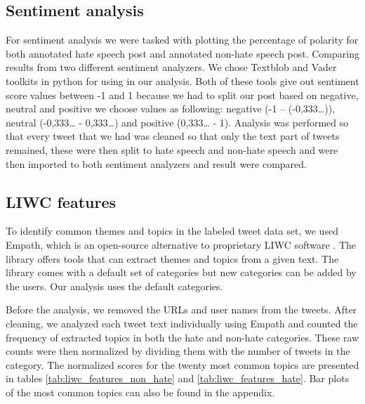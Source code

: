 \documentclass[conference]{IEEEtran}
\begin{document}
\subsection{Sentiment analysis}
For sentiment analysis we were tasked with plotting the percentage of polarity for both annotated hate speech post and annotated non-hate speech post.
Comparing results from two different sentiment analyzers. We chose Textblob and Vader toolkits in python for using in our analysis. Both of these tools give out sentiment score values between -1 and 1
because we had to split our post based on negative, neutral and positive we choose values as following: negative (-1 – (-0,333…)), neutral (-0,333… - 0,333…) and positive (0,333… - 1).
Analysis was performed so that every tweet that we had was cleaned so that only the text part of tweets remained, these were then split to hate speech and non-hate speech and were then imported to both sentiment analyzers and result were compared.
\subsection{LIWC features}
To identify common themes and topics in the labeled tweet data set, we 
used Empath, which is an open-source alternative to proprietary LIWC software  \cite{fast2016empath}. 
The library offers tools that can extract themes and topics from a given text.
The library comes with a default set of categories but new categories can be added by the users. 
Our analysis uses the default categories.

Before the analysis, we removed the URLs and user names from the tweets. After cleaning, we analyzed each tweet text individually using Empath and counted the frequency of extracted topics in both the hate and non-hate categories. 
These raw counts were then normalized by dividing them with the number of tweets in the category. The normalized 
scores for the twenty most common topics are presented in tables \ref{tab:liwc_features_non_hate} 
and \ref{tab:liwc_features_hate}. Bar plots of the most common topics can also be found in the appendix.
\end{document}
